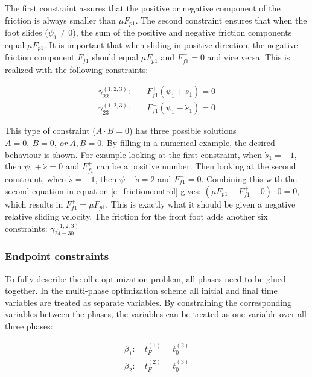 \documentclass[default,iicol]{sn-jnl}
\begin{document}
The first constraint assures that the positive or negative component of the
friction is always smaller than $\mu F_{p1}$. The second constraint ensures
that when the foot slides ($\psi_1 \not = 0$),  the sum of the positive and
negative friction components equal $\mu F_{p1}$. It is important that when
sliding in positive direction, the negative friction component $F_{f1}^-$
should equal $\mu F_{p1}$ and $F_{f1}^+=0$ and vice versa. This is realized
with the following constraints:

\begin{equation}
\begin{split}
    \gamma_{22}^{(1,2,3)}: \quad & F_{f1}^+ (\psi_1 + \dot s_1)  = 0 \\
    \gamma_{23}^{(1,2,3)}: \quad & F_{f1}^- (\psi_1 - \dot s_1)  = 0
\end{split}
\end{equation}

This type of constraint ($A\cdot B = 0$) has three possible solutions $A= 0,\
B=0,\ or\ A,B = 0$. By filling in a numerical example, the desired behaviour is
shown. For example looking at the first constraint, when $\dot s_1 = -1$, then
$\psi_1 + \dot s =  0$ and $F_{f1}^+$ can be a positive number. Then looking at
the second constraint, when $\dot s = -1$, then $\psi - \dot s = 2$ and
$F_{f1}^- = 0$. Combining this with the second equation in equation
\ref{e_frictioncontrol} gives: $(\mu F_{p1} - F_{f1}^+ - 0) \cdot 0 = 0$, which
results in $F_{f1}^+ = \mu F_{p1}$. This is exactly what it should be given a
negative relative sliding velocity. The friction for the front foot adds
another six constraints: $\gamma_{24-30}^{(1,2,3)}$

\subsubsection{Endpoint constraints} \label{p_endpoints}
To fully describe the ollie optimization problem, all phases need to be glued together. In the multi-phase optimization scheme all initial and final time variables are treated as separate variables. By constraining the corresponding variables between the phases, the variables can be treated as one variable over all three phases: 

\begin{equation}
    \begin{array}{c}
         \beta_1: \quad t_F^{(1)} = t_0^{(2)}  \\
         \beta_2: \quad t_F^{(2)} = t_0^{(3)}  \\
    \end{array}
\end{equation}
\end{document}
